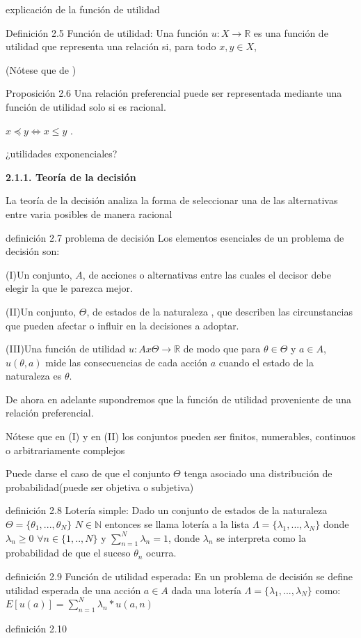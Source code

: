 \documentclass[11pt, a4paper]{article} %
\newcommand{\R}{\ensuremath{\mathbb{R}}}
\begin{document}
explicación de la función de utilidad

Definición 2.5 Función de utilidad: Una función $u:X \to \R$ es una función de utilidad que representa una relación si, para todo $x,y \in X$,

(Nótese que de  )


Proposición 2.6 
Una relación preferencial puede ser representada mediante una función de utilidad solo si es racional.

$x \preceq y \iff x \le y$ .

¿utilidades exponenciales?


{\bfseries \large 2.1.1. Teoría de la decisión} \vspace{5mm}

La teoría de la decisión analiza la forma de seleccionar una de las alternativas entre varia posibles de manera racional

definición 2.7 problema de decisión  
 Los elementos esenciales de un problema de decisión son:
  
  (I)Un conjunto, $A$, de acciones o alternativas entre las cuales el decisor debe elegir la que le parezca mejor.
  
  (II)Un conjunto, $\Theta$, de estados de la naturaleza , que describen las circunstancias que pueden afectar o influir en la decisiones a adoptar.
  
  (III)Una función de utilidad $u:Ax\Theta \to \R$ de modo que  para $\theta \in \Theta $ y $a \in A$, $u(\theta , a)$ mide las consecuencias de cada acción $a$ cuando el estado de la naturaleza es $\theta$.
   
De ahora en adelante supondremos que la función de utilidad proveniente de una relación preferencial.
 
Nótese que en (I) y en (II) los conjuntos pueden ser finitos, numerables, continuos o arbitrariamente complejos

Puede darse el caso de que el conjunto $\Theta$ tenga asociado una distribución de probabilidad(puede ser objetiva o subjetiva)

definición 2.8 Lotería simple: Dado un conjunto de estados de la naturaleza $\Theta =\{ \theta_1,...,\theta_N \} $ $N \in \mathbb{N}$ entonces se llama lotería a la lista $\Lambda =\{ \lambda_1,...,\lambda_N\} $ donde $\lambda_n \ge 0$ $\forall n \in \{ 1,..,N\} $ y $\sum_{n=1}^{N} \lambda_n=1$, donde $\lambda_n$ se interpreta como la probabilidad de que el suceso $\theta_n$ ocurra.



definición 2.9 Función de utilidad esperada:
En un problema de decisión se define utilidad esperada de una acción $a \in A$ dada una lotería $ \Lambda =\{ \lambda_1,...,\lambda_N\} $ como:
$E[u(a)]=\sum_{n=1}^{N}\lambda_n*u(a,n)$

definición 2.10


\newpage

\end{document}
